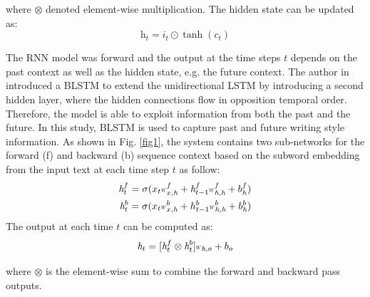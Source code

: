 \documentclass[conference]{IEEEtran}
\newcommand*{\Scale}[2][4]{\scalebox{#1}{$#2$}}%
\begin{document}
where $\otimes$ denoted element-wise multiplication. The hidden state can be updated as:
\setlength{\arraycolsep}{-1pt}
\begin{equation}\label{eqn4}
    \textit{h}_{t}= i_{t}\odot\tanh{(c_{t})} 
\end{equation}

The RNN model was forward and the output at the time steps $t$ depends on the past context as well as the hidden state, e.g. the future context. The author in \cite{schuster1997bidirectional} introduced a BLSTM to extend the unidirectional LSTM by introducing a second hidden layer, where the hidden connections flow in opposition temporal order. Therefore, the model is able to exploit information from both the past and the future. In this study, BLSTM is used to capture past and future writing style information. As shown in Fig. \ref{fig1}, the system contains two sub-networks for the forward (f) and backward (b) sequence context based on the subword embedding from the input text at each time step $t$ as follow:
\setlength{\arraycolsep}{-2pt}
\begin{equation}\label{eqn5}
\begin{split}
    \textit{h}^{f}_{t}= \sigma(x_{t}\Scale[0.5]W^{f}_{x,\textit{h}}+\textit{h}^{f}_{t-1}\Scale[0.5]W^{f}_{\textit{h},\textit{h}}+b^{f}_{\textit{h}})\\
    \textit{\textit{h}}^{b}_{t}= \sigma(x_{t}\Scale[0.5]W^{b}_{x,\textit{h}}+h^{b}_{t-1}\Scale[0.5]W^{b}_{\textit{h},\textit{h}}+b^{b}_{\textit{h}})
\end{split}
\end{equation}
The output at each time $t$ can be computed as:
\begin{equation}\label{eqn6}
     \textit{h}_{t}= [\textit{h}^{f}_{t} \otimes \textit{h}^{b}_{t}]\Scale[0.5]W_{\textit{h},o}+b_{o}
\end{equation}

where $\otimes$ is the element-wise sum to combine the forward and backward pass outputs.
\end{document}
